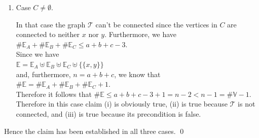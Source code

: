\begin{enumerate}
\begin{enumerate}
    Then by induction hypothesis either $\mathcal{T}_A$ or $\mathcal{T}_B$ would not be connected.  But this is
    not possible because all nodes in $\mathcal{T}_A$ are connected to $x$, while all nodes in
    $\mathcal{T}_B$ are connected to $y$.  Hence this case is impossible.
    \green{$\surd$}
  \item Case $C \not= \emptyset$.

    In that case the graph $\mathcal{T}$ can't be connected since the vertices in $C$ are connected to
    neither $x$ nor $y$.  Furthermore, we have
    \\[0.2cm]
    \hspace*{1.3cm}
    $\# \mathbb{E}_A + \# \mathbb{E}_B + \# \mathbb{E}_C \leq a + b + c - 3$.
    \\[0.2cm]
    Since we have
    \\[0.2cm]
    \hspace*{1.3cm}
    $\mathbb{E} = \mathbb{E}_A \uplus \mathbb{E}_B \uplus \mathbb{E}_C \uplus \bigl\{\{x,y\}\bigr\}$
    \\[0.2cm]
    and, furthermore, $n = a + b + c$, we know that
    \\[0.2cm]
    \hspace*{1.3cm}
    $\#\mathbb{E} = \#\mathbb{E}_A + \#\mathbb{E}_B + \#\mathbb{E}_C + 1$.
    \\[0.2cm]
    Therefore it follows that $\#\mathbb{E} \leq a + b + c - 3 + 1 = n - 2 < n - 1 = \#\mathbb{V} - 1$.
    \\[0.2cm]
    Therefore in this case claim (i) is obviously true, (ii) is true because $\mathcal{T}$ is not connected,
    and (iii) is true because its precondition is false.
     \green{$\surd$}
  \end{enumerate}
  Hence the claim has been established in all three cases. \qed
\end{enumerate} 

